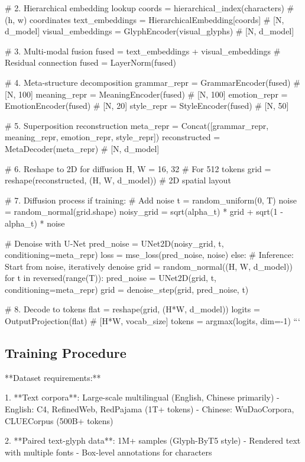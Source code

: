 \documentclass[11pt]{article}
\begin{document}
# 2. Hierarchical embedding lookup
coords = hierarchical_index(characters)  # (h, w) coordinates
text_embeddings = HierarchicalEmbedding[coords]  # [N, d_model]
visual_embeddings = GlyphEncoder(visual_glyphs)  # [N, d_model] 

# 3. Multi-modal fusion
fused = text_embeddings + visual_embeddings  # Residual connection
fused = LayerNorm(fused)

# 4. Meta-structure decomposition
grammar_repr = GrammarEncoder(fused)    # [N, 100]
meaning_repr = MeaningEncoder(fused)    # [N, 100]  
emotion_repr = EmotionEncoder(fused)    # [N, 20]
style_repr = StyleEncoder(fused)        # [N, 50]

# 5. Superposition reconstruction  
meta_repr = Concat([grammar_repr, meaning_repr, emotion_repr, style_repr])
reconstructed = MetaDecoder(meta_repr)  # [N, d_model]

# 6. Reshape to 2D for diffusion
H, W = 16, 32  # For 512 tokens
grid = reshape(reconstructed, (H, W, d_model))  # 2D spatial layout

# 7. Diffusion process
if training:
    # Add noise
    t = random_uniform(0, T)
    noise = random_normal(grid.shape)
    noisy_grid = sqrt(alpha_t) * grid + sqrt(1 - alpha_t) * noise
    
    # Denoise with U-Net
    pred_noise = UNet2D(noisy_grid, t, conditioning=meta_repr)
    loss = mse_loss(pred_noise, noise)
else:
    # Inference: Start from noise, iteratively denoise
    grid = random_normal((H, W, d_model))
    for t in reversed(range(T)):
        pred_noise = UNet2D(grid, t, conditioning=meta_repr)
        grid = denoise_step(grid, pred_noise, t)

# 8. Decode to tokens
flat = reshape(grid, (H*W, d_model))
logits = OutputProjection(flat)  # [H*W, vocab_size]
tokens = argmax(logits, dim=-1)
```

\subsection*{Training Procedure}

**Dataset requirements:**

1. **Text corpora**: Large-scale multilingual (English, Chinese primarily)
   - English: C4, RefinedWeb, RedPajama (1T+ tokens)
   - Chinese: WuDaoCorpora, CLUECorpus (500B+ tokens)

2. **Paired text-glyph data**: 1M+ samples (Glyph-ByT5 style)
   - Rendered text with multiple fonts
   - Box-level annotations for characters
\end{document}
